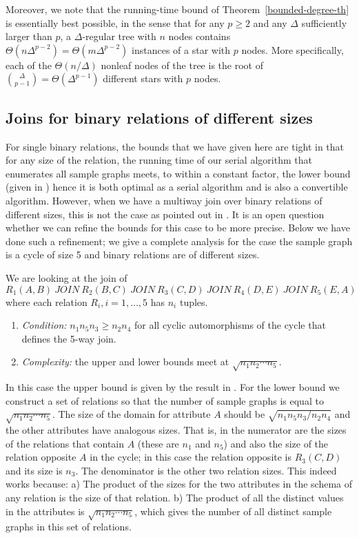 Moreover, we note that the running-time bound of Theorem~\ref{bounded-degree-th} is essentially best possible, in the sense that for any $p \geq 2$ and any $\Delta$ sufficiently larger than $p$, a $\Delta$-regular tree with $n$ nodes contains $\Theta(n \Delta^{p-2}) = \Theta(m \Delta^{p-2})$ instances of a star with $p$ nodes. More specifically, each of the $\Theta(n/\Delta)$ nonleaf nodes of the tree is the root of $\binom{\Delta}{p-1} = \Theta(\Delta^{p-1})$ different stars with $p$ nodes.

\subsection{Joins for binary relations of different sizes}

For single binary relations, the bounds that we have given here are tight in that for any size of the relation,
the running time of our serial algorithm that enumerates all sample
graphs meets, to within a constant factor, the lower bound (given in \cite{Alon81}) hence it is
both optimal as a serial algorithm and is also a convertible algorithm. However, when we have a multiway
join over binary relations of different sizes, this is not the case as pointed out in \cite{NgoPRR12}. It is an open
question whether we can refine the bounds for this case to be more precise. Below we have done such a refinement; we give a complete
analysis for the case the sample graph is a cycle of size 5 and binary relations are of different sizes.

We are looking at the join of
$$R_1(A,B) ~JOIN~ R_2(B,C) ~JOIN~
 R_3(C,D) ~JOIN~ R_4(D,E) ~JOIN~ R_5(E,A)$$
where each relation $R_i, i=1,\ldots ,5$ has $n_i$ tuples.


\begin{enumerate}
 \item {\sl Condition:}  $n_1 n_5 n_3 \geq n_2 n_4$ for all cyclic automorphisms of the cycle that defines the 5-way join.

\item {\sl Complexity:}  the upper and lower bounds meet at $\sqrt{n_1 n_2 \cdots n_5}$.
\end{enumerate}

In this case the upper bound is given by the result in \cite{NgoPRR12}.
For the lower bound we construct a set of relations so that the number of sample graphs is equal to $\sqrt{n_1 n_2 \cdots n_5}$.
The size of the domain for attribute $A$ should be $\sqrt{n_1 n_5 n_3 / n_2 n_4}$
and the other attributes have analogous sizes. That is, in the
numerator are the sizes of the relations that contain $A$ (these are  $n_1$ and $n_5$)
and also the size of the relation opposite $A$ in the cycle; in this
case the relation opposite is $R_3(C,D)$ and its size is $n_3$. The
denominator is the other two relation sizes. This indeed works because: a) The product
of the sizes for the two attributes in the schema of any relation is
the size of that relation.  b) The product of all the distinct values in the attributes is
$\sqrt{n_1 n_2 \cdots n_5}$, which gives the number of all distinct sample graphs in this set of relations.



